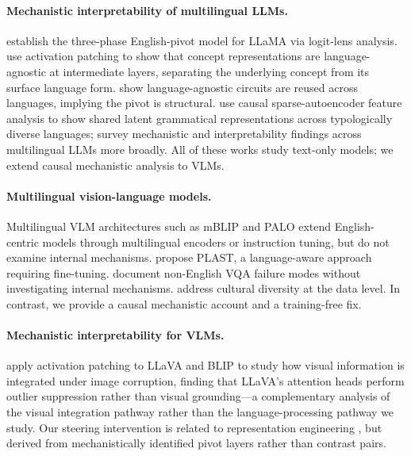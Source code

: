 \documentclass[11pt]{article}
\begin{document}
\paragraph{Mechanistic interpretability of multilingual LLMs.}
\citet{wendler-etal-2024-llamas} establish the three-phase English-pivot model
for LLaMA via logit-lens analysis.
\citet{dumas-etal-2024-llamas} use activation patching to show that concept
representations are language-agnostic at intermediate layers, separating the
underlying concept from its surface language form.
\citet{ferrando-costa-jussa-2024-similarity} show language-agnostic circuits
are reused across languages, implying the pivot is structural.
\citet{brinkmann-etal-2025-large} use causal sparse-autoencoder feature analysis
to show shared latent grammatical representations across typologically diverse
languages; \citet{resck-etal-2025-explainability} survey mechanistic and
interpretability findings across multilingual LLMs more broadly.
All of these works study text-only models; we extend causal mechanistic
analysis to VLMs.

\paragraph{Multilingual vision-language models.}
Multilingual VLM architectures such as mBLIP \citep{geigle-etal-2023-mblip}
and PALO \citep{maaz-etal-2024-palo} extend English-centric models through
multilingual encoders or instruction tuning, but do not examine internal mechanisms.
\citet{fan-etal-2025-plast} propose PLAST, a language-aware approach requiring
fine-tuning.
\citet{song-etal-2025-missing} document non-English VQA failure modes without
investigating internal mechanisms.
\citet{nyandwi-etal-2025-grounding} address cultural diversity at the data
level.
In contrast, we provide a causal mechanistic account and a training-free fix.

\paragraph{Mechanistic interpretability for VLMs.}
\citet{golovanevsky-etal-2025-notice} apply activation patching to LLaVA and
BLIP to study how visual information is integrated under image corruption,
finding that LLaVA's attention heads perform outlier suppression rather than
visual grounding---a complementary analysis of the visual integration pathway
rather than the language-processing pathway we study.
Our steering intervention is related to representation engineering
\citep{zou-etal-2023-representation}, but derived from mechanistically
identified pivot layers rather than contrast pairs.
\end{document}
